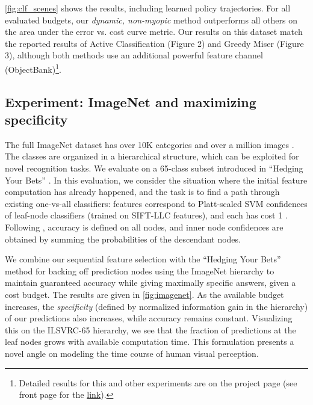 \autoref{fig:clf_scenes} shows the results, including learned policy trajectories.
For all evaluated budgets, our \emph{dynamic, non-myopic} method outperforms all others on the area under the error vs. cost curve metric.
Our results on this dataset match the reported results of Active Classification \parencite{Gao-NIPS-2011} (Figure 2) and Greedy Miser \parencite{Xu-ICML-2012} (Figure 3), although both methods use an additional powerful feature channel (ObjectBank)\footnote{Detailed results for this and other experiments are on the project page (see front page for the \href{http://sergeykarayev.com/recognition-on-a-budget/}{link}).}.

\subsection{Experiment: ImageNet and maximizing specificity}



The full ImageNet dataset has over 10K categories and over a million images \parencite{Deng-ECCV-2010}.
The classes are organized in a hierarchical structure, which can be exploited for novel recognition tasks.
We evaluate on a 65-class subset introduced in ``Hedging Your Bets'' \parencite{Deng-CVPR-2012}.
In this evaluation, we consider the situation where the initial feature computation has already happened, and the task is to find a path through existing one-vs-all classifiers: features correspond to Platt-scaled SVM confidences of leaf-node classifiers (trained on SIFT-LLC features), and each has cost 1 \parencite{Deng-ECCV-2010}.
Following \parencite{Deng-CVPR-2012}, accuracy is defined on all nodes, and inner node confidences are obtained by summing the probabilities of the descendant nodes.

We combine our sequential feature selection with the ``Hedging Your Bets'' method for backing off prediction nodes using the ImageNet hierarchy to maintain guaranteed accuracy while giving maximally specific answers, given a cost budget.
The results are given in \autoref{fig:imagenet}.
As the available budget increases, the \emph{specificity} (defined by normalized information gain in the hierarchy) of our predictions also increases, while accuracy remains constant.
Visualizing this on the ILSVRC-65 hierarchy, we see that the fraction of predictions at the leaf nodes grows with available computation time.
This formulation presents a novel angle on modeling the time course of human visual perception.
